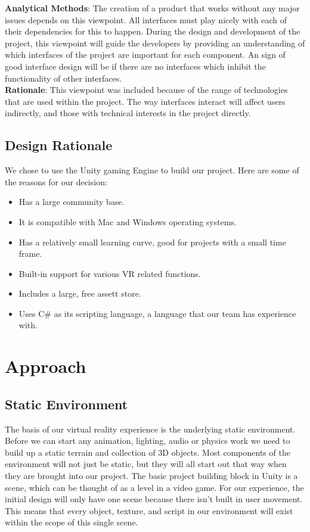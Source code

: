 \documentclass[10pt,journal,compsoc,onecolumn, draftclsnofoot]{IEEEtran}
\begin{document}
\hangindent=0.5cm \textbf{Analytical Methods}: The creation of a product that works without any major issues depends on this viewpoint.
All interfaces must play nicely with each of their dependencies for this to happen.
During the design and development of the project, this viewpoint will guide the developers by providing an understanding of which interfaces of the project are important for each component.
An sign of good interface design will be if there are no interfaces which inhibit the functionality of other interfaces.\\

\hangindent=0.5cm \textbf{Rationale}: This viewpoint was included because of the range of technologies that are used within the project.
The way interfaces interact will affect users indirectly, and those with technical interests in the project directly. \\


\subsection{Design Rationale}
We chose to use the Unity gaming Engine to build our project. Here are some of the reasons for our decision:
\begin{itemize}
  \item Has a large community base.
  \item It is compatible with Mac and Windows operating systems.
  \item Has a relatively small learning curve, good for projects with a small time frame.
  \item Built-in support for various VR related functions.
  \item Includes a large, free assett store.
  \item Uses C\# as its scripting language, a language that our team has experience with.
\end{itemize}

\section{Approach}
\subsection{Static Environment}
The basis of our virtual reality experience is the underlying static
environment. Before we can start any animation, lighting, audio or physics
work we need to build up a static terrain and collection of 3D objects.
Most components of the environment will not just be static, but they will all
start out that way when they are brought into our project. The basic project
building block in Unity is a scene, which can be thought of as a level in a
video game. \cite{microsoft_mag} For our experience, the initial design will
only have one scene because there isn't built in user movement. This means that
every object, texture, and script in our environment will exist within the
scope of this single scene.
\end{document}
